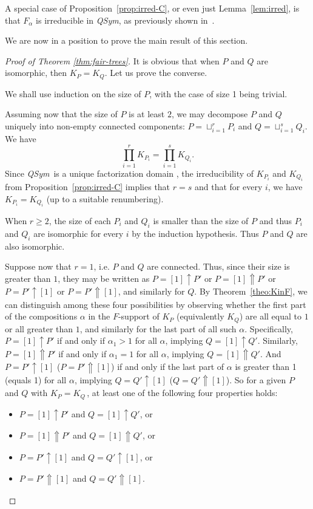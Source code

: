 \documentclass[ALCO,Unicode,published]{cedram}
\newcommand{\qsym}{{\it{QSym}}}
\newcommand{\wP}{\uparrow}
\newcommand{\sP}{\Uparrow}
\begin{document}
\begin{remark}
A special case of Proposition~\ref{prop:irred-C}, or even just Lemma~\ref{lem:irred}, is that $F_\alpha$ is irreducible in \qsym, as previously shown in~\cite{LaPy08}.
\end{remark}

We are now in a position to prove the main result of this section.  

\begin{proof}[Proof of Theorem \ref{thm:fair-trees}]
It is obvious that when $P$ and $Q$ are isomorphic, then $K_P=K_Q$.
Let us prove the converse.

We shall use induction on the size of $P$, with the case of size 1 being trivial.

Assuming now that the size of $P$ is at least $2$, 
we may decompose $P$ and $Q$ uniquely into non-empty
connected components:
$P=\sqcup_{i=1}^r P_i$
and
$Q=\sqcup_{i=1}^s Q_i$.
We have
\[
\prod_{i=1}^r K_{P_i}
=
\prod_{i=1}^s K_{Q_i}.
\]
Since \qsym\  is a unique factorization domain \cite{Haz01,LaPy08,MaRe95}, 
the irreducibility of $K_{P_i}$ and $K_{Q_i}$ from Proposition~\ref{prop:irred-C} 
implies that $r=s$ and that for every $i$, we have $K_{P_i} = K_{Q_i}$ (up to a suitable renumbering).

When $r \ge 2$, the size of each $P_i$ and $Q_i$ is smaller than the size of $P$
and thus $P_i$ and $Q_i$ are isomorphic for every $i$ by the induction hypothesis. 
Thus $P$ and $Q$ are also isomorphic. 

Suppose now that $r = 1$, i.e. $P$ and $Q$ are connected. Thus, 
since their size is greater than $1$, they may be written as
$P=[1]\wP P'$ or $P=[1]\sP P'$
or
$P=P'\wP [1]$ or $P=P' \sP [1]$,
and similarly for $Q$.
By Theorem~\ref{theo:KinF}, we can distinguish among these four possibilities by observing whether the first part of the compositions $\alpha$ in the $F$-support of $K_P$ (equivalently $K_Q$) are all equal to $1$ or all greater than $1$, and similarly for the last part of all such $\alpha$. Specifically, $P=[1]\wP P'$ if and only if $\alpha_1 > 1$ for all $\alpha$, implying $Q=[1]\wP Q'$.  Similarly, $P=[1]\sP P'$ if and only if $\alpha_1=1$ for all $\alpha$, implying $Q=[1]\sP Q'$.  And $P=P'\wP [1]$ (\resp $P=P' \sP [1]$) if and only if the last part of $\alpha$ is greater than 1 (\resp equals 1) for all $\alpha$, implying $Q=Q'\wP [1]$ (\resp $Q=Q' \sP [1]$).  
So for a given $P$ and $Q$ with $K_P = K_Q$\,, at least one of the following four properties holds:
\begin{itemize}
\item $P=[1]\wP P'$ and $Q=[1]\wP Q'$, or 
\item $P=[1]\sP P'$ and $Q=[1]\sP Q'$, or
\item $P=P'\wP [1]$ and $Q=Q'\wP [1]$, or 
\item $P=P'\sP [1]$ and $Q=Q'\sP [1]$.
\end{itemize}


\end{proof}
\end{document}
